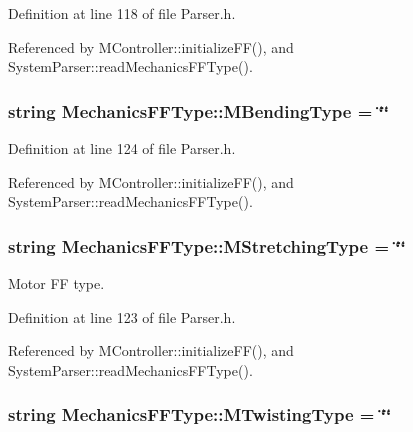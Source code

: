 Definition at line 118 of file Parser.\+h.



Referenced by M\+Controller\+::initialize\+F\+F(), and System\+Parser\+::read\+Mechanics\+F\+F\+Type().

\hypertarget{structMechanicsFFType_a0bed42c13d0c33d3b37738b44494d8bf}{
\subsubsection[{M\+Bending\+Type}]{\setlength{\rightskip}{0pt plus 5cm}string Mechanics\+F\+F\+Type\+::\+M\+Bending\+Type = \char`\"{}\char`\"{}}}\label{structMechanicsFFType_a0bed42c13d0c33d3b37738b44494d8bf}


Definition at line 124 of file Parser.\+h.



Referenced by M\+Controller\+::initialize\+F\+F(), and System\+Parser\+::read\+Mechanics\+F\+F\+Type().

\hypertarget{structMechanicsFFType_a30fba4413229de2a9ab88af789e47292}{
\subsubsection[{M\+Stretching\+Type}]{\setlength{\rightskip}{0pt plus 5cm}string Mechanics\+F\+F\+Type\+::\+M\+Stretching\+Type = \char`\"{}\char`\"{}}}\label{structMechanicsFFType_a30fba4413229de2a9ab88af789e47292}


Motor F\+F type. 



Definition at line 123 of file Parser.\+h.



Referenced by M\+Controller\+::initialize\+F\+F(), and System\+Parser\+::read\+Mechanics\+F\+F\+Type().

\hypertarget{structMechanicsFFType_a76f25f6b34dc38d73dfecb236500c53b}{
\subsubsection[{M\+Twisting\+Type}]{\setlength{\rightskip}{0pt plus 5cm}string Mechanics\+F\+F\+Type\+::\+M\+Twisting\+Type = \char`\"{}\char`\"{}}}\label{structMechanicsFFType_a76f25f6b34dc38d73dfecb236500c53b}



